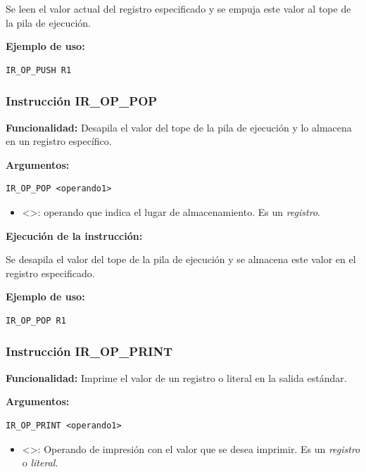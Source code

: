 \noindent
Se leen el valor actual del registro especificado y se empuja este valor al tope de la pila de ejecución.
\vspace{0.3cm}

\noindent
\textbf{Ejemplo de uso:}
\begin{verbatim}
IR_OP_PUSH R1
\end{verbatim}

\subsubsection{Instrucción IR\_OP\_POP}\label{subsubsec:IR_OP_POP}
\noindent
\textbf{Funcionalidad:} Desapila el valor del tope de la pila de ejecución y lo almacena en un registro específico.

\noindent
\textbf{Argumentos:}
\begin{verbatim}
IR_OP_POP <operando1>
\end{verbatim}
\begin{itemize}
    \item <>: operando que indica el lugar de almacenamiento. Es un \textit{registro}.
\end{itemize}

\noindent
\textbf{Ejecución de la instrucción:}
\vspace{0.3cm}

\noindent
Se desapila el valor del tope de la pila de ejecución y se almacena este valor en el registro especificado.
\vspace{0.3cm}

\noindent
\textbf{Ejemplo de uso:}
\begin{verbatim}
IR_OP_POP R1
\end{verbatim}

\subsubsection{Instrucción IR\_OP\_PRINT}\label{subsubsec:IR_OP_PRINT}
\noindent
\textbf{Funcionalidad:} Imprime el valor de un registro o literal en la salida estándar.

\noindent
\textbf{Argumentos:}
\begin{verbatim}
IR_OP_PRINT <operando1>
\end{verbatim}
\begin{itemize}
    \item <>: Operando de impresión con el valor que se desea imprimir. Es un \textit{registro} o \textit{literal}.
\end{itemize}

